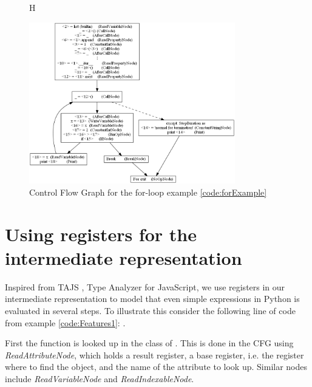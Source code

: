 \begin{figure}{H}
  \begin{center}
    \includegraphics[width=0.8\textwidth]{images/for-example-cfg2.png}
  \end{center}
  \caption{Control Flow Graph for the for-loop example \ref{code:forExample}}
  \label{fig:forCfg}
\end{figure}





\section{Using registers for the intermediate representation}
\label{CFG calls}
Inspired from TAJS \cite{tajs}, Type Analyzer for JavaScript, we use registers in our intermediate representation to model that even simple expressions in Python is evaluated in several steps. To illustrate this consider the following line of code from example \ref{code:Features1}: .

First the function  is looked up in the class of . This is done in the CFG using \textit{ReadAttributeNode}, which holds a result register, a base register, i.e. the register where to find the object, and the name of the attribute to look up. Similar nodes include \textit{ReadVariableNode} and \textit{ReadIndexableNode}.

